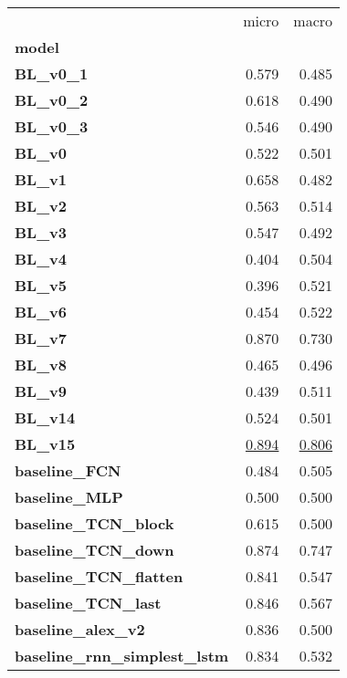 \begin{adjustbox}{width=\textwidth}
\begin{tabular}{lrr}
\toprule
{} &  micro &  macro \\
\textbf{model                              } &        &        \\
\midrule
\textbf{BL\_v0\_1                 } &  0.579 &  0.485 \\
\textbf{BL\_v0\_2                 } &  0.618 &  0.490 \\
\textbf{BL\_v0\_3                 } &  0.546 &  0.490 \\
\textbf{BL\_v0                   } &  0.522 &  0.501 \\
\textbf{BL\_v1                   } &  0.658 &  0.482 \\
\textbf{BL\_v2                   } &  0.563 &  0.514 \\
\textbf{BL\_v3                   } &  0.547 &  0.492 \\
\textbf{BL\_v4                   } &  0.404 &  0.504 \\
\textbf{BL\_v5                   } &  0.396 &  0.521 \\
\textbf{BL\_v6                   } &  0.454 &  0.522 \\
\textbf{BL\_v7                   } &  0.870 &  0.730 \\
\textbf{BL\_v8                   } &  0.465 &  0.496 \\
\textbf{BL\_v9                   } &  0.439 &  0.511 \\
\textbf{BL\_v14                  } &  0.524 &  0.501 \\
\textbf{BL\_v15                  } &  \underline{0.894} &  \underline{0.806} \\
\textbf{baseline\_FCN            } &  0.484 &  0.505 \\
\textbf{baseline\_MLP            } &  0.500 &  0.500 \\
\textbf{baseline\_TCN\_block      } &  0.615 &  0.500 \\
\textbf{baseline\_TCN\_down       } &  0.874 &  0.747 \\
\textbf{baseline\_TCN\_flatten    } &  0.841 &  0.547 \\
\textbf{baseline\_TCN\_last       } &  0.846 &  0.567 \\
\textbf{baseline\_alex\_v2        } &  0.836 &  0.500 \\
\textbf{baseline\_rnn\_simplest\_lstm} &  0.834 &  0.532 \\
\bottomrule
\end{tabular}
\end{adjustbox}